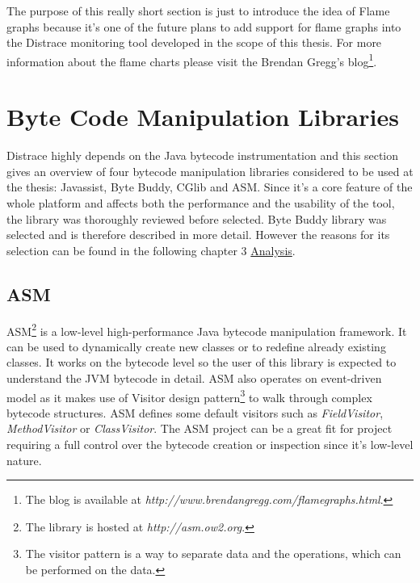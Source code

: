 The purpose of this really short section is just to introduce the idea of Flame graphs because it's one of the future plans to add support for flame graphs into the Distrace monitoring tool developed in the scope of this thesis. For more information about the flame charts please visit the Brendan Gregg's blog\footnote{The blog is available at \textit{http://www.brendangregg.com/flamegraphs.html}.}.
\section{Byte Code Manipulation Libraries}
Distrace highly depends on the Java bytecode instrumentation and this section gives an overview of four bytecode manipulation libraries considered to be used at the thesis: Javassist, Byte Buddy, CGlib and ASM. Since it's a core feature of the whole platform and affects both the performance and the usability of the tool, the library was thoroughly reviewed before selected. Byte Buddy library was selected and is therefore described in more detail. However the reasons for its selection can be found in the following chapter 3 \hyperref[analysis]{Analysis}.

\subsection{ASM}
\label{asm}
ASM\footnote{The library is hosted at \textit{http://asm.ow2.org}.} is a low-level high-performance Java bytecode manipulation framework. It can be used to dynamically create new classes or to redefine already existing classes. It works on the bytecode level so the user of this library is expected to understand the JVM bytecode in detail. ASM also operates on event-driven model as it makes use of Visitor design pattern\footnote{The visitor pattern is a way to separate data and the operations, which can be performed on the data.} to walk through complex bytecode structures. ASM defines some default visitors such as \textit{FieldVisitor}, \textit{MethodVisitor} or \textit{ClassVisitor}. The ASM project can be a great fit for project requiring a full control over the bytecode creation or inspection since it's low-level nature.
